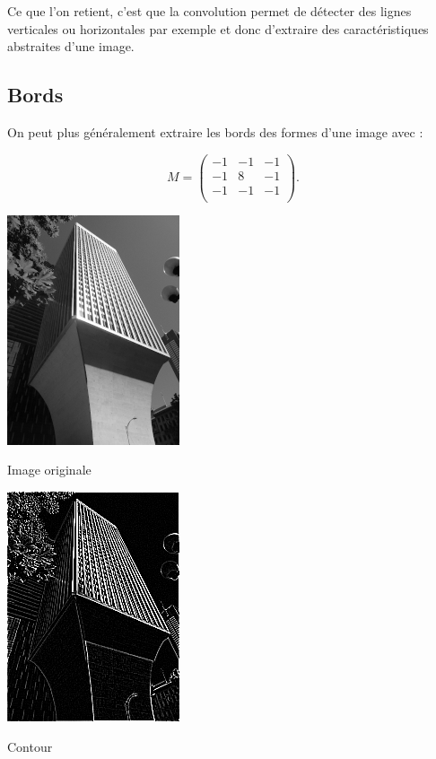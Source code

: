 \documentclass[11pt,class=report,crop=false]{standalone}
\begin{document}
Ce que l'on retient, c'est que la convolution permet de détecter des lignes verticales ou horizontales par exemple et donc d'extraire des caractéristiques abstraites d'une image.

\subsection{Bords}

On peut plus généralement extraire les bords des formes d'une image avec : 

$$M = 
\begin{pmatrix}
-1&-1&-1\\
-1&8&-1\\
-1&-1&-1\\
\end{pmatrix}.$$


\begin{center}
	\begin{minipage}{0.45\textwidth}\center
       \includegraphics[scale=\myscale,scale=0.7]{figures/image_contour_avant}
	
	Image originale
	\end{minipage}
	\begin{minipage}{0.45\textwidth}\center
	 \includegraphics[scale=\myscale,scale=0.7]{figures/image_contour_apres}
	
	Contour
    \end{minipage}	
\end{center}
\end{document}
